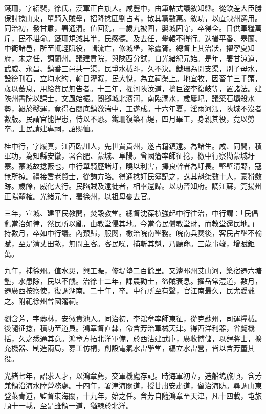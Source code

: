 \begin{pinyinscope}
鐵珊，字紹裴，徐氏，漢軍正白旗人。咸豐中，由筆帖式議敘知縣。從欽差大臣勝保討捻山東，單騎入賊壘，招降捻匪劉占考，散其黨數萬。敘功，以直隸州選用。同治初，發甘肅，署通渭。值回亂，一歲九被圍，嬰城固守，卒得全。日供軍糧萬斤，民不堪命。鐵珊規減其半，民感德。及去任，攀轅不得行。迭攝平番、皋蘭、中衛諸邑，所至輒輕賦役，輯流亡，修城堡，除蠹胥。總督上其治狀，擢寧夏知府，未之任，調蘭州。議建貢院，與陜西分試，自光緒紀元始。是年，署甘涼道，武威、永昌、鎮番三邑共一渠，民爭水械斗，久不決。鐵珊為開支渠，別子母水，設徬刊石，立均水約，輪日灌溉，民大悅，為立祠渠上。地宜牧，因畜羊三千頭，歲以蕃息，用給貧民無告者。十三年，擢河陜汝道，擒巨盜李復岐等，置諸法。建陜州書院以課士，文風始振。閿鄉城北濱河，南臨澗水，歲屢圮，議築石壩殺水勢，艱於鑿運，竟得石閿底鎮激湍中，工遂成。十六年夏，淫雨河漲，陜城不沒者數版。民謂官能捍患，恃以不恐。鐵珊復築石堤，四月畢工，身親其役，竟以勞卒。士民請建專祠，詔賜恤。

桂中行，字履真，江西臨川人，先世賈貴州，遂占籍鎮遠。為諸生。咸、同間，積軍功，為知縣安徽，署合肥、蒙城、阜陽。曾國籓率師征捻，檄中行察勘蒙城圩寨。蒙城故捻藪也，中行單騎歷諸圩，曉以利害，擇良幹者為圩長。堅壁清野，寇無所掠。禮接耆老賢士，從詢方略。得通捻奸民簿記之，誅其魁桀數十人，豪猾斂跡。歲餘，威化大行。民陷賊及遠徙者，相率還歸。以功晉知府。調江蘇，筦揚州正陽釐榷。光緒元年，署徐州，以祖母憂去官。

三年，宣城、建平民教閧，焚毀教堂。總督沈葆楨強起中行往治，中行謂：「民倡亂當治如律，然民所以亂，由教堂侵其地。今當令民償教堂財，而教堂還民地。」持數月，卒如中行議。內艱歸，服闋，檄治皖南墾務。皖南兵燹後，客民占墾不輸賦，至是清丈田畝，無問主客。客民噪，捕斬其魁，乃聽命。三歲事竣，增賦鉅萬。

九年，補徐州。值水災，興工賑，修堤墊二百餘里。又濬邳州艾山河，築宿遷六塘墊，水患除，民以不饑。治徐十二年，課農勸士，盜賊衰息。擢岳常澧道，數月，遷廣西按察使，復調湖南。二十年，卒。中行所至有聲，官江南最久，民尤愛戴之。附祀徐州曾國籓祠。

劉含芳，字薌林，安徽貴池人。同治初，李鴻章率師東征，從克蘇州，司運糧械。後隨征捻，積功至道員。鴻章督直隸，命含芳治軍械天津。得西洋利器，省覽機括，久之悉通其意。鴻章方拓北洋軍備，於西沽建武庫，廣收博儲，以肄將士，擴充機器、制造兩局，募工仿構，創設電氣水雷學堂，編立水雷營，皆以含芳董其役。

光緒七年，詔求人才，以鴻章薦，交軍機處存記。時海軍初立，造船塢旅順，含芳兼領沿海水陸營務處。十四年，署津海關道，授甘肅安肅道，留治海防。尋調山東登萊青道，監督東海關，十九年，始之任。含芳自隨鴻章至天津，凡十四載，屯旅順十一載，至是雖領一道，猶隸於北洋。


\end{pinyinscope}
